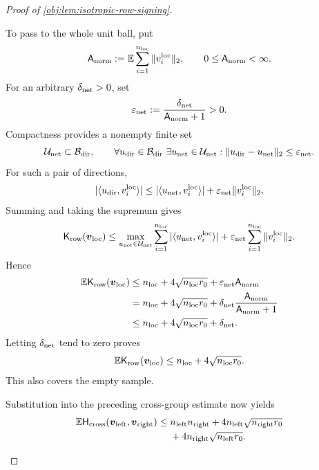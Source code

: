 \documentclass[11pt]{article}
\begin{document}
\begin{proof}[Proof of \cref{obj:lem:isotropic-row-signing}]
\begin{enumerate}
To pass to the whole unit ball, put
\[
\mathsf A_{\rm norm}
:=\mathbb E\sum_{i=1}^{n_{\rm loc}}\|v_i^{\rm loc}\|_2,
\qquad
0\leq\mathsf A_{\rm norm}<\infty.
\]
For an arbitrary \(\delta_{\rm net}>0\), set
\[
\varepsilon_{\rm net}
:=\frac{\delta_{\rm net}}{\mathsf A_{\rm norm}+1}>0.
\]
Compactness provides a nonempty finite set
\[
\mathcal U_{\rm net}\subset\mathcal B_{\rm dir},
\qquad
\forall u_{\rm dir}\in\mathcal B_{\rm dir}\ 
\exists u_{\rm net}\in\mathcal U_{\rm net}:
\|u_{\rm dir}-u_{\rm net}\|_2\leq\varepsilon_{\rm net}.
\]
For such a pair of directions,
\[
|\langle u_{\rm dir},v_i^{\rm loc}\rangle|
\leq
|\langle u_{\rm net},v_i^{\rm loc}\rangle|
+\varepsilon_{\rm net}\|v_i^{\rm loc}\|_2.
\]
Summing and taking the supremum gives
\[
\mathsf K_{\rm row}(\boldsymbol v_{\rm loc})
\leq
\max_{u_{\rm net}\in\mathcal U_{\rm net}}
\sum_{i=1}^{n_{\rm loc}}|\langle u_{\rm net},v_i^{\rm loc}\rangle|
+\varepsilon_{\rm net}\sum_{i=1}^{n_{\rm loc}}\|v_i^{\rm loc}\|_2.
\]
Hence
\[
\begin{aligned}
\mathbb E\mathsf K_{\rm row}(\boldsymbol v_{\rm loc})
&\leq n_{\rm loc}+4\sqrt{n_{\rm loc}r_0}
+\varepsilon_{\rm net}\mathsf A_{\rm norm}\\
&=n_{\rm loc}+4\sqrt{n_{\rm loc}r_0}
+\delta_{\rm net}\frac{\mathsf A_{\rm norm}}{\mathsf A_{\rm norm}+1}\\
&\leq n_{\rm loc}+4\sqrt{n_{\rm loc}r_0}+\delta_{\rm net}.
\end{aligned}
\]
Letting \(\delta_{\rm net}\) tend to zero proves
\[
\mathbb E\mathsf K_{\rm row}(\boldsymbol v_{\rm loc})
\leq n_{\rm loc}+4\sqrt{n_{\rm loc}r_0}.
\]
This also covers the empty sample.

Substitution into the preceding cross-group estimate now yields
\[
\begin{aligned}
\mathbb E\mathsf H_{\rm cross}(\boldsymbol v_{\rm left},\boldsymbol v_{\rm right})
\leq{}&
n_{\rm left}n_{\rm right}
+4n_{\rm left}\sqrt{n_{\rm right}r_0}\\
&+4n_{\rm right}\sqrt{n_{\rm left}r_0}.
\end{aligned}
\]


\end{enumerate}
\end{proof}
\end{document}

